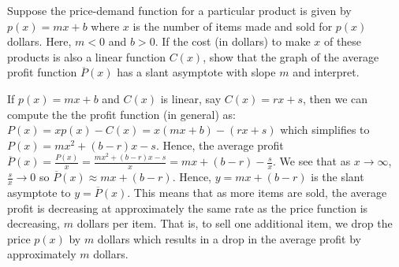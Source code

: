 \documentclass{ximera}
\begin{document}
\begin{problem}\label{slantyintaverageprofitexercise}
Suppose the price-demand function for a particular product is given by $p(x) = mx + b$  where $x$ is the number of items made and sold for $p(x)$ dollars.  Here,  $m<0$ and $b>0$.  If the cost (in dollars) to make $x$ of these products is also a linear  function $C(x)$, show that the graph of the average profit function $\overline{P}(x)$ has a slant asymptote with slope $m$ and interpret.

\begin{solution}
    If $p(x) = mx + b$ and $C(x)$ is linear, say $C(x) = rx+s$, then we can compute the the profit function (in general) as: $P(x) = xp(x) - C(x) = x(mx+b) - (rx+s)$ which simplifies to $P(x) = mx^2 + (b-r)x -s$.  Hence, the average profit $\overline{P}(x) = \frac{P(x)}{x} = \frac{mx^2 + (b-r)x -s}{x} = mx + (b-r) - \frac{s}{x}$.  We see that as $x \rightarrow \infty$, $\frac{s}{x} \rightarrow 0$ so $\overline{P}(x) \approx mx  + (b-r)$.  Hence, $y = mx + (b-r)$ is the slant asymptote  to $y = \overline{P}(x)$.  This means that as more items are sold, the average profit is decreasing at approximately the same rate as the price function is decreasing, $m$ dollars per item.  That is, to sell one additional item, we drop the price $p(x)$ by $m$ dollars which results in a drop in the average profit by approximately $m$ dollars.
\end{solution}

\end{problem}
\end{document}
